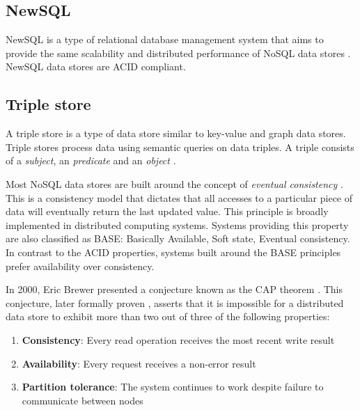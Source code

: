 \subsection{NewSQL}
\label{subsec:newsql}

NewSQL is a type of relational database management system that aims to provide the same scalability and distributed performance of NoSQL data stores \autocite{Grolinger2013}.
NewSQL data stores are ACID compliant.

\subsection{Triple store}
\label{subsec:triple-store}

A triple store is a type of data store similar to key-value and graph data stores.
Triple stores process data using semantic queries on data triples.
A triple consists of a \textit{subject}, an \textit{predicate} and an \textit{object} \autocite{Rohloff2007}.

\clearpage{}

Most NoSQL data stores are built around the concept of \textit{eventual consistency} \autocite{Brewer2000}.
This is a consistency model that dictates that all accesses to a particular piece of data will eventually return the last updated value.
This principle is broadly implemented in distributed computing systems.
Systems providing this property are also classified as BASE: Basically Available, Soft state, Eventual consistency.
In contrast to the ACID properties, systems built around the BASE principles prefer availability over consistency.

In 2000, Eric Brewer presented a conjecture known as the CAP theorem \autocite{Brewer2000}.
This conjecture, later formally proven \autocite{GilbertLynch2002}, asserts that it is impossible for a distributed data store to exhibit more than two out of three of the following properties:

\begin{enumerate}
  \item \textbf{Consistency}: Every read operation receives the most recent write result
  \item \textbf{Availability}: Every request receives a non-error result
  \item \textbf{Partition tolerance}: The system continues to work despite failure to communicate between nodes
\end{enumerate}

